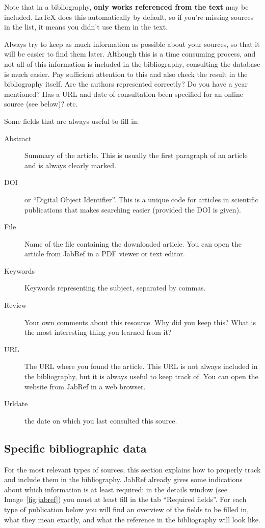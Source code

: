 Note that in a bibliography, \textbf{only works referenced from the text} may be included. {\LaTeX} does this automatically by default, so if you're missing sources in the list, it means you didn't use them in the text.

Always try to keep as much information as possible about your sources, so that it will be easier to find them later. Although this is a time consuming process, and not all of this information is included in the bibliography, consulting the database is much easier. Pay sufficient attention to this and also check the result in the bibliography itself. Are the authors represented correctly? Do you have a year mentioned? Has a URL and date of consultation been specified for an online source (see below)? etc.

Some fields that are always useful to fill in:

\begin{description}
   \item[Abstract] Summary of the article. This is usually the first paragraph of an article and is always clearly marked.
   \item[DOI] or ``Digital Object Identifier''. This is a unique code for articles in scientific publications that makes searching easier (provided the DOI is given).
   \item[File] Name of the file containing the downloaded article. You can open the article from JabRef in a PDF viewer or text editor.
   \item[Keywords] Keywords representing the subject, separated by commas.
   \item[Review] Your own comments about this resource. Why did you keep this? What is the most interesting thing you learned from it?
   \item[URL] The URL where you found the article. This URL is not always included in the bibliography, but it is always useful to keep track of. You can open the website from JabRef in a web browser.
   \item[Urldate] the date on which you last consulted this source.   
\end{description}

\subsection{Specific bibliographic data}
\label{sub:specific_bibliographic_data}

For the most relevant types of sources, this section explains how to properly track and include them in the bibliography. JabRef already gives some indications about which information is at least required: in the details window (see Image~\ref{fig:jabref}) you must at least fill in the tab ``Required fields''. For each type of publication below you will find an overview of the fields to be filled in, what they mean exactly, and what the reference in the bibliography will look like.

